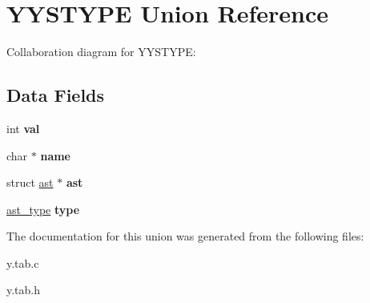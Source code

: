 \hypertarget{union_y_y_s_t_y_p_e}{}\section{Y\+Y\+S\+T\+Y\+PE Union Reference}
\label{union_y_y_s_t_y_p_e}


Collaboration diagram for Y\+Y\+S\+T\+Y\+PE\+:
\subsection*{Data Fields}
\begin{DoxyCompactItemize}
\item 
\mbox{\label{union_y_y_s_t_y_p_e_aa0ccb5ee6d882ee3605ff47745c6467b}} 
int {\bfseries val}
\item 
\mbox{\label{union_y_y_s_t_y_p_e_ad547fb8186b526cb1b588daad4334fbe}} 
char $\ast$ {\bfseries name}
\item 
\mbox{\label{union_y_y_s_t_y_p_e_acfe6dda4268774a7eb23648d7a805f0d}} 
struct \hyperlink{structast}{ast} $\ast$ {\bfseries ast}
\item 
\mbox{\label{union_y_y_s_t_y_p_e_a8321fc8e556a418583dd74ee9fcc2bf7}} 
\hyperlink{ast_8h_a77091c187ac9a89404fac2e8226daef3}{ast\+\_\+type} {\bfseries type}
\end{DoxyCompactItemize}


The documentation for this union was generated from the following files\+:\begin{DoxyCompactItemize}
\item 
y.\+tab.\+c\item 
y.\+tab.\+h\end{DoxyCompactItemize}
